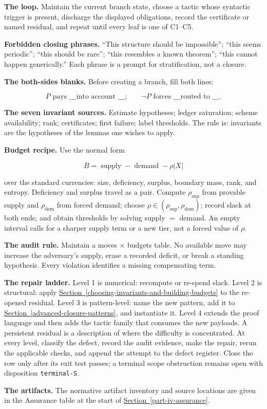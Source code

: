 \documentclass[
  11pt,
]{article}
\theoremstyle{definition}
\newcommand{\secref}[1]{\hyperref[#1]{Section~\ref*{#1}}}
\begin{document}
\textbf{The loop.} Maintain the current branch state, choose a tactic
whose syntactic trigger is present, discharge the displayed obligations,
record the certificate or named residual, and repeat until every leaf is
one of C1--C5.

\textbf{Forbidden closing phrases.} ``This structure should be
impossible''; ``this seems periodic''; ``this should be rare''; ``this
resembles a known theorem''; ``this cannot happen generically.'' Each
phrase is a prompt for stratification, not a closure.

\textbf{The both-sides blanks.} Before creating a branch, fill both
lines:

\[
P \text{ pays \_\_\_ into account \_\_\_;}
\qquad
\neg P \text{ forces \_\_\_ routed to \_\_\_.}
\]

\textbf{The seven invariant sources.} Estimate hypotheses; ledger
saturation; scheme availability; rank; certificates; first failure;
label thresholds. The rule is: invariants are the hypotheses of the
lemmas one wishes to apply.

\textbf{Budget recipe.} Use the normal form

\[
B=\operatorname{supply}-\operatorname{demand}-\rho|X|
\]

over the standard currencies: size, deficiency, surplus, boundary mass,
rank, and entropy. Deficiency and surplus travel as a pair. Compute
\(\rho_{\mathrm{sup}}\) from provable supply and \(\rho_{\mathrm{dem}}\)
from forced demand; choose
\(\rho\in(\rho_{\mathrm{sup}},\rho_{\mathrm{dem}})\); record slack at
both ends; and obtain thresholds by solving supply \(=\) demand. An
empty interval calls for a sharper supply term or a new tier, not a
forced value of \(\rho\).

\textbf{The audit rule.} Maintain a moves × budgets table. No available
move may increase the adversary's supply, erase a recorded deficit, or
break a standing hypothesis. Every violation identifies a missing
compensating term.

\textbf{The repair ladder.} Level 1 is numerical: recompute or re-spend
slack. Level 2 is structural: apply \secref{choosing-invariants-and-building-budgets} to the re-opened residual.
Level 3 is pattern-level: name the new pattern, add it to \secref{advanced-closure-patterns},
and instantiate it. Level 4 extends the proof language and then
adds the tactic family that consumes the new payloads. A persistent
residual is a description of where the difficulty is concentrated. At
every level, classify the defect, record the audit evidence, make the
repair, rerun the applicable checks, and append the attempt to the defect
register. Close the row only after its exit test passes; a terminal scope
obstruction remains open with disposition \texttt{terminal-S}.

\textbf{The artifacts.} The normative artifact inventory and source
locations are given in the Assurance table at the start of
\secref{part-iv-assurance}.

  
  
\end{document}
